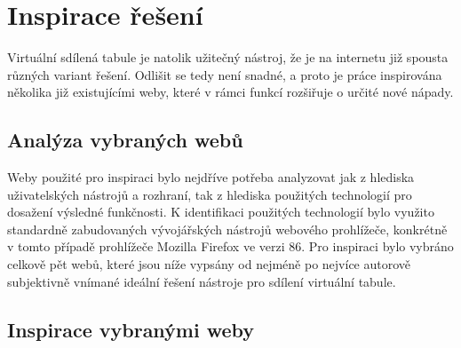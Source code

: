 \chapter{Inspirace řešení}
\label{chap:2}
Virtuální sdílená tabule je natolik užitečný nástroj, že je na internetu již spousta různých variant řešení.
Odlišit se tedy není snadné, a proto je práce inspirována několika již existujícími weby, které v rámci funkcí rozšiřuje o určité nové nápady.




\section{Analýza vybraných webů}
\label{sec:2.1}
Weby použité pro inspiraci bylo nejdříve potřeba analyzovat jak z hlediska uživatelských nástrojů a rozhraní, tak z hlediska použitých technologií pro dosažení výsledné funkčnosti.
K identifikaci použitých technologií bylo využito standardně zabudovaných vývojářských nástrojů webového prohlížeče, konkrétně v tomto případě prohlížeče Mozilla Firefox ve verzi 86.
Pro inspiraci bylo vybráno celkově pět webů, které jsou níže vypsány od nejméně po nejvíce autorově subjektivně vnímané ideální řešení nástroje pro sdílení virtuální tabule.




\section{Inspirace vybranými weby}
